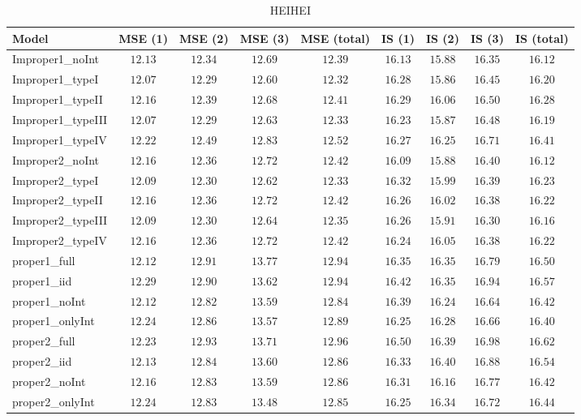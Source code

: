 \begin{table}

\caption{\label{tab:model-choice-sc9}HEIHEI}
\centering
\begin{tabular}{lcccccccc}
\hline
Model  & MSE (1) & MSE (2) & MSE (3) & MSE (total) & IS (1) & IS (2) & IS (3) & \multicolumn{1}{c}{IS (total)} \\ 
\hline
Improper1_noInt  & $12.13$ & $12.34$ & $12.69$ & $12.39$ & $16.13$ & $15.88$ & $16.35$ & $16.12$ \\
Improper1_typeI  & $12.07$ & $12.29$ & $12.60$ & $12.32$ & $16.28$ & $15.86$ & $16.45$ & $16.20$ \\
Improper1_typeII  & $12.16$ & $12.39$ & $12.68$ & $12.41$ & $16.29$ & $16.06$ & $16.50$ & $16.28$ \\
Improper1_typeIII  & $12.07$ & $12.29$ & $12.63$ & $12.33$ & $16.23$ & $15.87$ & $16.48$ & $16.19$ \\
Improper1_typeIV  & $12.22$ & $12.49$ & $12.83$ & $12.52$ & $16.27$ & $16.25$ & $16.71$ & $16.41$ \\
Improper2_noInt  & $12.16$ & $12.36$ & $12.72$ & $12.42$ & $16.09$ & $15.88$ & $16.40$ & $16.12$ \\
Improper2_typeI  & $12.09$ & $12.30$ & $12.62$ & $12.33$ & $16.32$ & $15.99$ & $16.39$ & $16.23$ \\
Improper2_typeII  & $12.16$ & $12.36$ & $12.72$ & $12.42$ & $16.26$ & $16.02$ & $16.38$ & $16.22$ \\
Improper2_typeIII  & $12.09$ & $12.30$ & $12.64$ & $12.35$ & $16.26$ & $15.91$ & $16.30$ & $16.16$ \\
Improper2_typeIV  & $12.16$ & $12.36$ & $12.72$ & $12.42$ & $16.24$ & $16.05$ & $16.38$ & $16.22$ \\
proper1_full  & $12.12$ & $12.91$ & $13.77$ & $12.94$ & $16.35$ & $16.35$ & $16.79$ & $16.50$ \\
proper1_iid  & $12.29$ & $12.90$ & $13.62$ & $12.94$ & $16.42$ & $16.35$ & $16.94$ & $16.57$ \\
proper1_noInt  & $12.12$ & $12.82$ & $13.59$ & $12.84$ & $16.39$ & $16.24$ & $16.64$ & $16.42$ \\
proper1_onlyInt  & $12.24$ & $12.86$ & $13.57$ & $12.89$ & $16.25$ & $16.28$ & $16.66$ & $16.40$ \\
proper2_full  & $12.23$ & $12.93$ & $13.71$ & $12.96$ & $16.50$ & $16.39$ & $16.98$ & $16.62$ \\
proper2_iid  & $12.13$ & $12.84$ & $13.60$ & $12.86$ & $16.33$ & $16.40$ & $16.88$ & $16.54$ \\
proper2_noInt  & $12.16$ & $12.83$ & $13.59$ & $12.86$ & $16.31$ & $16.16$ & $16.77$ & $16.42$ \\
proper2_onlyInt  & $12.24$ & $12.83$ & $13.48$ & $12.85$ & $16.25$ & $16.34$ & $16.72$ & $16.44$ \\
\hline 
\end{tabular}


\end{table}